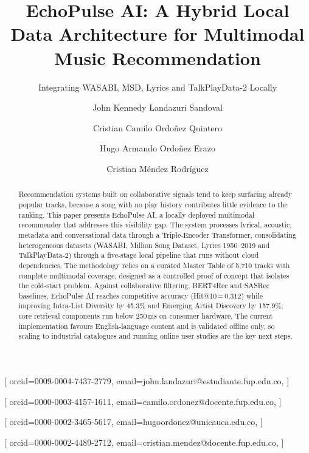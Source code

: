\documentclass[]{ceurart}
\begin{document}


\title{EchoPulse AI: A Hybrid Local Data Architecture for Multimodal Music
  Recommendation}
\subtitle{Integrating WASABI, MSD, Lyrics and TalkPlayData-2 Locally}

\author[1]{John Kennedy Landazuri Sandoval}[%
orcid=0009-0004-7437-2779,
email=john.landazuri@estudiante.fup.edu.co,
]
\cormark[1]

\author[1]{Cristian Camilo Ordoñez Quintero}[%
orcid=0000-0003-4157-1611,
email=camilo.ordonez@docente.fup.edu.co,
]
\cormark[2]

\author[2]{Hugo Armando Ordoñez Erazo}[%
orcid=0000-0002-3465-5617,
email=hugoordonez@unicauca.edu.co,
]

\author[1]{Cristian Méndez Rodríguez}[%
orcid=0000-0002-4489-2712,
email=cristian.mendez@docente.fup.edu.co,
]

\address[1]{IMS Research Group, Fundación Universitaria de Popayán,
  Popayán, Cauca, Colombia}
\address[2]{Research Group on Technology and Information Management (GT),
  Universidad del Cauca, Popayán, Cauca, Colombia}


\begin{abstract}
Recommendation systems built on collaborative signals tend to keep surfacing
already popular tracks, because a song with no play history contributes little
evidence to the ranking. This paper presents EchoPulse AI, a locally deployed
multimodal recommender that addresses this visibility gap. The system processes
lyrical, acoustic, metadata and conversational data through a Triple-Encoder
Transformer, consolidating heterogeneous datasets (WASABI, Million Song
Dataset, Lyrics 1950--2019 and TalkPlayData-2) through a five-stage local
pipeline that runs without cloud dependencies. The methodology relies on a
curated Master Table of 5,710 tracks with complete multimodal coverage,
designed as a controlled proof of concept that isolates the cold-start problem.
Against collaborative filtering, BERT4Rec and SASRec baselines, EchoPulse AI
reaches competitive accuracy (Hit@10\,=\,0.312) while improving Intra-List
Diversity by 45.3\% and Emerging Artist Discovery by 157.9\%; core retrieval
components run below 250\,ms on consumer hardware. The current implementation
favours English-language content and is validated offline only, so scaling to
industrial catalogues and running online user studies are the key next steps.
\end{abstract}
\end{document}
